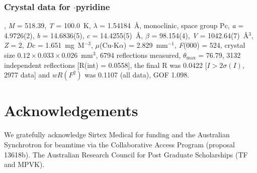 \begin{refsection}
\subsubsection{Crystal data for \texorpdfstring{$\cdot$pyridine}{C19H12N4O4Se.C5H5N}}
, \emph{M} = 518.39, \emph{T} = 100.0~K, $\lambda$ = 1.54184~\AA, monoclinic, space group Pc, \emph{a} = 4.9726(2), \emph{b} = 14.6836(5), \emph{c} = 14.4255(5)~\AA, $\beta$ = 98.154(4)\degree, \emph{V} = 1042.64(7)~\AA$^3$, \emph{Z} = 2, $Dc$ = 1.651~mg~M$^{-3}$, $\mu$(Cu-K$\alpha$) = 2.829~mm$^{-1}$, \emph{F}(000) = 524, crystal size $0.12 \times 0.033 \times 0.026$~mm$^3$, 6794 reflections measured, $\theta_{\mathrm{max}}$ = 76.79\degree, 3132 independent reflections [R(int) = 0.0558], the final R was 0.0422 [$I > 2\sigma(I)$, 2977 data] and $wR(F^2)$ was 0.1107 (all data), GOF 1.098.

\section{Acknowledgements}
We gratefully acknowledge Sirtex Medical for funding and the Australian Synchrotron for beamtime via the Collaborative Access Program (proposal 13618b).
The Australian Research Council for Post Graduate Scholarships (TF and MPVK).

\printbibliography[heading=subbibliography]
\end{refsection}

